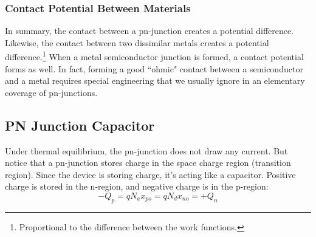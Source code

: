 \subsubsection{Contact Potential Between Materials}
In summary, the contact between a pn-junction creates a potential difference.    Likewise, the contact between two dissimilar metals creates a potential difference.\footnote{Proportional to the difference between the work functions.}   When a metal semiconductor junction is formed, a contact potential forms as well.  In fact, forming a good ``ohmic" contact between a semiconductor and a metal requires special engineering that we usually ignore in an elementary coverage of pn-junctions.   
\subsection{PN Junction Capacitor}
Under thermal equilibrium, the pn-junction does not draw any current.   But notice that a pn-junction stores charge in the space charge region (transition region).   Since the device is storing charge, it's acting like a capacitor.    Positive charge is stored in the n-region, and negative charge is in the p-region:
\begin{equation} 
	-Q_p = q{N_a}{x_{po}} = q{N_d}{x_{no}} = +Q_n
\end{equation}
